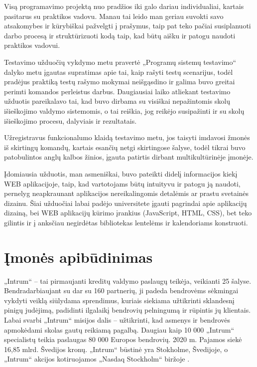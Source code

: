 \documentclass{VUMIFPSkursinis}
\begin{document}
Visą programavimo projektą nuo pradžios iki galo dariau individualiai, kartais pasitarus su praktikos vadovu. Manau tai leido man geriau suvokti savo atsakomybes ir kūrybiškai pažvelgti į prašymus, taip pat teko pačiai susiplanuoti darbo procesą ir struktūrizuoti kodą taip, kad būtų aišku ir patogu naudoti praktikos vadovui.

Testavimo užduočių vykdymo metu pravertė „Programų sistemų testavimo“ dalyko metu įgautas supratimas apie tai, kaip rašyti testų scenarijus, todėl pradėjus praktiką testų rašymo mokymai neišgąsdino ir galima buvo greitai perimti komandos perleistus darbus. Daugiausiai laiko atliekant testavimo užduotis pareikalavo tai, kad buvo dirbama su visiškai nepažintomis skolų išieškojimo valdymo sistemomis, o tai reiškia, jog reikėjo susipažinti ir su skolų išieškojimo procesu, dalyviais ir rezultatais. 

Užregistravus funkcionalumo klaidą testavimo metu, jos taisyti imdavosi žmonės iš skirtingų komandų, kartais esančių netgi skirtingose šalyse, todėl tikrai buvo patobulintos anglų kalbos žinios, įgauta patirtis dirbant multikultūrinėje įmonėje.

Įdomiausia užduotis, man asmeniškai, buvo pateikti didelį informacijos kiekį WEB aplikacijoje, taip, kad vartotojams būtų intuityvu ir patogu ją naudoti, pernelyg neapkraunant aplikacijos nereikalingomis detalėmis ar prastu svetainės dizainu. Šiai užduočiai labai padėjo universitete įgauti pagrindai apie aplikacijų dizainą, bei WEB aplikacijų kūrimo įrankius (JavaScript, HTML, CSS), bet teko gilintis ir į anksčiau negirdėtas bibliotekas lentelėms ir kalendoriams konstruoti. 



\section {Įmonės apibūdinimas}

„Intrum“ – tai pirmaujanti kreditų valdymo paslaugų teikėja, veikianti 25 šalyse. Bendradarbiaujant su dar su 160 partnerių, ji padeda bendrovėms sėkmingai vykdyti veiklą siūlydama sprendimus, kuriais siekiama užtikrinti sklandesnį pinigų judėjimą, padidinti ilgalaikį bendrovių pelningumą ir rūpintis jų klientais. Labai svarbi „Intrum“ misijos dalis – užtikrinti, kad asmenys ir bendrovės apmokėdami skolas gautų reikiamą pagalbą. Daugiau kaip 10 000 „Intrum“ specialistų teikia paslaugas 80 000 Europos bendrovių. 2020 m. Pajamos siekė 16,85 mlrd. Švedijos kronų. „Intrum“ būstinė yra Stokholme, Švedijoje, o „Intrum“ akcijos kotiruojamos „Nasdaq Stockholm“ biržoje \cite{Intrum}.
\end{document}
